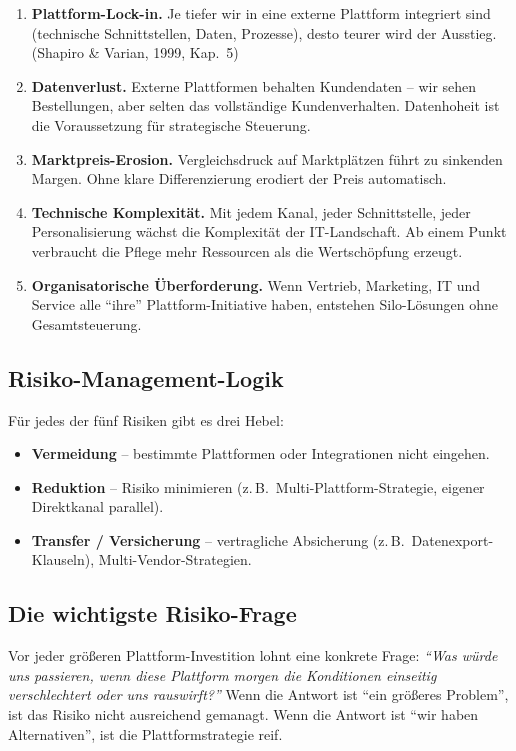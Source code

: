 \documentclass[11pt,a4paper,oneside]{article}
\newcommand{\fachbegriff}[1]{\textbf{#1}}
\newcommand{\quelle}[1]{{\footnotesize\color{lpGray}(#1)}}
\begin{document}
\begin{enumerate}
  \item \fachbegriff{Plattform-Lock-in.} Je tiefer wir in eine externe Plattform integriert sind (technische Schnittstellen, Daten, Prozesse), desto teurer wird der Ausstieg. \quelle{Shapiro \& Varian, 1999, Kap.~5}
  \item \fachbegriff{Datenverlust.} Externe Plattformen behalten Kundendaten -- wir sehen Bestellungen, aber selten das vollständige Kundenverhalten. Datenhoheit ist die Voraussetzung für strategische Steuerung.
  \item \fachbegriff{Marktpreis-Erosion.} Vergleichsdruck auf Marktplätzen führt zu sinkenden Margen. Ohne klare Differenzierung erodiert der Preis automatisch.
  \item \fachbegriff{Technische Komplexität.} Mit jedem Kanal, jeder Schnittstelle, jeder Personalisierung wächst die Komplexität der IT-Landschaft. Ab einem Punkt verbraucht die Pflege mehr Ressourcen als die Wertschöpfung erzeugt.
  \item \fachbegriff{Organisatorische Überforderung.} Wenn Vertrieb, Marketing, IT und Service alle ``ihre'' Plattform-Initiative haben, entstehen Silo-Lösungen ohne Gesamtsteuerung.
\end{enumerate}

\subsection{Risiko-Management-Logik}

Für jedes der fünf Risiken gibt es drei Hebel:

\begin{itemize}
  \item \fachbegriff{Vermeidung} -- bestimmte Plattformen oder Integrationen nicht eingehen.
  \item \fachbegriff{Reduktion} -- Risiko minimieren (z.\,B.\ Multi-Plattform-Strategie, eigener Direktkanal parallel).
  \item \fachbegriff{Transfer / Versicherung} -- vertragliche Absicherung (z.\,B.\ Datenexport-Klauseln), Multi-Vendor-Strategien.
\end{itemize}

\subsection{Die wichtigste Risiko-Frage}

Vor jeder größeren Plattform-Investition lohnt eine konkrete Frage: \emph{``Was würde uns passieren, wenn diese Plattform morgen die Konditionen einseitig verschlechtert oder uns rauswirft?''} Wenn die Antwort ist ``ein größeres Problem'', ist das Risiko nicht ausreichend gemanagt. Wenn die Antwort ist ``wir haben Alternativen'', ist die Plattform­strategie reif.
\end{document}
